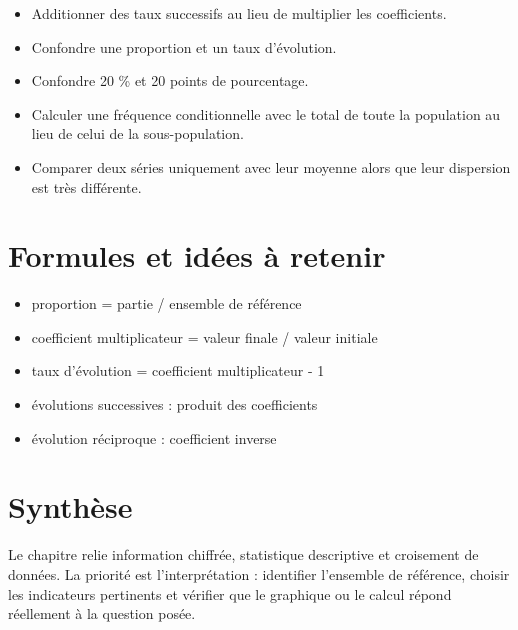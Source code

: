 \begin{itemize}
\item Additionner des taux successifs au lieu de multiplier les coefficients.
\item Confondre une proportion et un taux d'évolution.
\item Confondre 20 \% et 20 points de pourcentage.
\item Calculer une fréquence conditionnelle avec le total de toute la population au lieu de celui de la sous-population.
\item Comparer deux séries uniquement avec leur moyenne alors que leur dispersion est très différente.
\end{itemize}

\section{Formules et idées à retenir}

\begin{itemize}
\item proportion = partie / ensemble de référence
\item coefficient multiplicateur = valeur finale / valeur initiale
\item taux d'évolution = coefficient multiplicateur - 1
\item évolutions successives : produit des coefficients
\item évolution réciproque : coefficient inverse
\end{itemize}

\section{Synthèse}

Le chapitre relie information chiffrée, statistique descriptive et croisement de données. La priorité est l'interprétation : identifier l'ensemble de référence, choisir les indicateurs pertinents et vérifier que le graphique ou le calcul répond réellement à la question posée.
